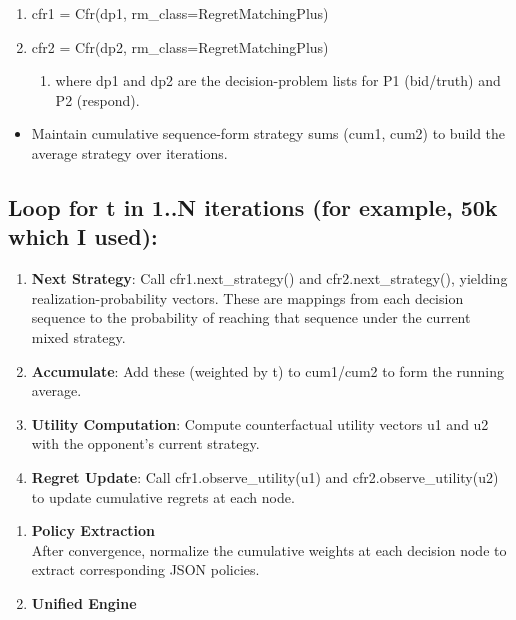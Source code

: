 \documentclass[
]{article}
\begin{document}
\begin{enumerate}
\def\labelenumi{\arabic{enumi}.}
\item
  cfr1 = Cfr(dp1, rm\_class=RegretMatchingPlus)
\item
  cfr2 = Cfr(dp2, rm\_class=RegretMatchingPlus)

  \begin{enumerate}
  \def\labelenumii{\arabic{enumii}.}
  \item
    where dp1 and dp2 are the decision-problem lists for P1 (bid/truth)
    and P2 (respond).
  \end{enumerate}
\end{enumerate}

\begin{itemize}
\item
  Maintain cumulative sequence-form strategy sums (cum1, cum2) to build
  the average strategy over iterations.
\end{itemize}

\subsection{\texorpdfstring{\textbf{Loop} for t in 1..N iterations (for
example, 50k which I
used):}{Loop for t in 1..N iterations (for example, 50k which I used):}}\label{loop-for-t-in-1..n-iterations-for-example-50k-which-i-used}

\begin{enumerate}
\def\labelenumi{\arabic{enumi}.}
\item
  \textbf{Next Strategy}: Call cfr1.next\_strategy() and
  cfr2.next\_strategy(), yielding realization-probability vectors. These
  are mappings from each decision sequence to the probability of
  reaching that sequence under the current mixed strategy.
\item
  \textbf{Accumulate}: Add these (weighted by t) to cum1/cum2 to form
  the running average.
\item
  \textbf{Utility Computation}: Compute counterfactual utility vectors
  u1 and u2 with the opponent's current strategy.
\item
  \textbf{Regret Update}: Call cfr1.observe\_utility(u1) and
  cfr2.observe\_utility(u2) to update cumulative regrets at each node.
\end{enumerate}

\begin{enumerate}
\def\labelenumi{\arabic{enumi}.}
\setcounter{enumi}{2}
\item
  \textbf{Policy Extraction\\
  }After convergence, normalize the cumulative weights at each decision
  node to extract corresponding JSON policies.
\item
  \textbf{Unified Engine}
\end{enumerate}
\end{document}
